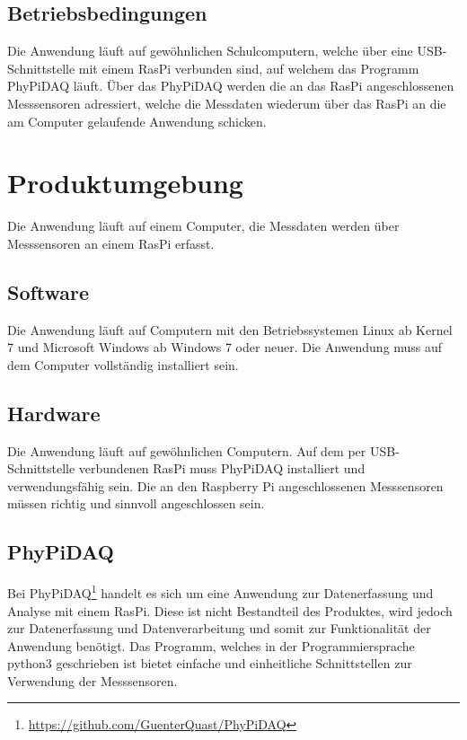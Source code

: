 \documentclass[parskip=full]{scrartcl}
\begin{document}
\subsection{Betriebsbedingungen}

Die Anwendung läuft auf gewöhnlichen Schulcomputern, welche über eine USB-Schnittstelle mit einem RasPi verbunden sind, auf welchem das Programm \gls{PhyPiDAQ} läuft. Über das \gls{PhyPiDAQ} werden die an das RasPi angeschlossenen Messsensoren adressiert, welche die Messdaten wiederum über das RasPi an die am Computer gelaufende Anwendung schicken. 


\section{Produktumgebung}\label{produktumgebung}

Die Anwendung läuft auf einem Computer, die Messdaten werden über Messsensoren an einem \gls{RasPi} erfasst.

\subsection{Software}

Die Anwendung läuft auf Computern mit den Betriebssystemen Linux ab Kernel 7 und Microsoft Windows ab Windows 7 oder neuer. Die Anwendung muss auf dem Computer vollständig installiert sein. 

\subsection{Hardware}

Die Anwendung läuft auf gewöhnlichen Computern.
Auf dem per USB-Schnittstelle verbundenen \gls{RasPi} muss PhyPiDAQ installiert und verwendungsfähig sein.
Die an den Raspberry Pi angeschlossenen Messsensoren müssen richtig und sinnvoll angeschlossen sein.

\subsection{PhyPiDAQ}

Bei PhyPiDAQ\footnote{\url{https://github.com/GuenterQuast/PhyPiDAQ}} handelt es sich um eine Anwendung zur Datenerfassung und Analyse mit einem \gls{RasPi}. Diese ist nicht Bestandteil des Produktes, wird jedoch zur Datenerfassung und Datenverarbeitung und somit zur Funktionalität der Anwendung  benötigt. Das Programm, welches in der Programmiersprache python3 geschrieben ist bietet einfache und einheitliche Schnittstellen zur Verwendung der Messsensoren.
\end{document}
